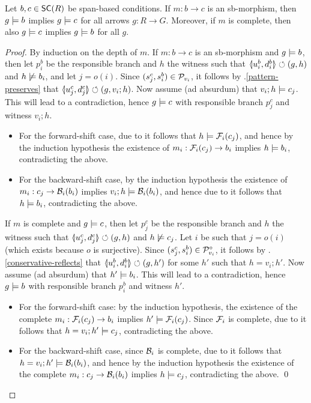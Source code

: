 \begin{proposition}
Let $b,c \in \SC{R}$ be span-based conditions. If $m:b\to c$ is an sb-morphism, then $g\models b$ implies $g \models c$ for all arrows $g:R\to G$. Moreover, if $m$ is complete, then also $g\models c$ implies $g\models b$ for all $g$.
\end{proposition}
%
\begin{proof}
By induction on the depth of $m$. If $m:b\to c$ is an sb-morphism and $g\models b$, then let $p^b_i$ be the responsible branch and $h$ the witness such that $\spanof{u^b_i}{d^b_i}\commutes (g,h)$ and $h\not\models b_i$, and let $j=o(i)$. Since $(s^c_j,s^b_i)\in \mathcal{P}_{v_i}$, it follows by .\ref{pattern-preserves} that $\spanof{u^c_j}{d^c_j}\commutes (g,v_i;h)$. Now assume (ad absurdum) that $v_i;h\models c_j$. This will lead to a contradiction, hence $g\models c$ with responsible branch $p^c_j$ and witness $v_i;h$.
\begin{itemize}[topsep=\smallskipamount]
\item For the forward-shift case, due to  it follows that $h\models \mathcal{F}_i(c_j)$, and hence by the induction hypothesis the existence of $m_i:\mathcal{F}_i(c_j)\to b_i$ implies $h\models b_i$, contradicting the above.

\item For the backward-shift case, by the induction hypothesis the existence of $m_i:c_j\to \mathcal{B}_i(b_i)$ implies $v_i;h\models \mathcal{B}_i(b_i)$, and hence due to  it follows that $h\models b_i$, contradicting the above.
\end{itemize}
If $m$ is complete and $g\models c$, then let $p^c_j$ be the responsible branch and $h$ the witness such that $\spanof{u^c_j}{d^c_j}\commutes (g,h)$ and $h\not\models c_j$. Let $i$ be such that $j=o(i)$ (which exists because $o$ is surjective). Since $(s^c_j,s^b_i)\in \mathcal{P}^\circ_{v_i}$, it follows by .\ref{conservative-reflects} that $\spanof{u^b_i}{d^b_i}\commutes (g,h')$ for some $h'$ such that $h=v_i;h'$. Now assume (ad absurdum) that $h'\models b_i$. This will lead to a contradiction, hence $g\models b$ with responsible branch $p^b_i$ and witness $h'$.
\begin{itemize}[topsep=\smallskipamount]
\item For the forward-shift case: by the induction hypothesis, the existence of the complete $m_i:\mathcal{F}_i(c_j)\to b_i$ implies $h'\models \mathcal{F}_i(c_j)$. Since $\mathcal{F}_i$ is complete, due to  it follows that $h=v_i;h'\models c_j$, contradicting the above.
\item For the backward-shift case, since $\mathcal{B}_i$ is complete, due to  it follows that $h=v_i;h'\models \mathcal{B}_i(b_i)$, and hence by the induction hypothesis the existence of the complete $m_i:c_j\to \mathcal{B}_i(b_i)$ implies $h\models c_j$, contradicting the above.
\qed
\end{itemize}
\end{proof}
